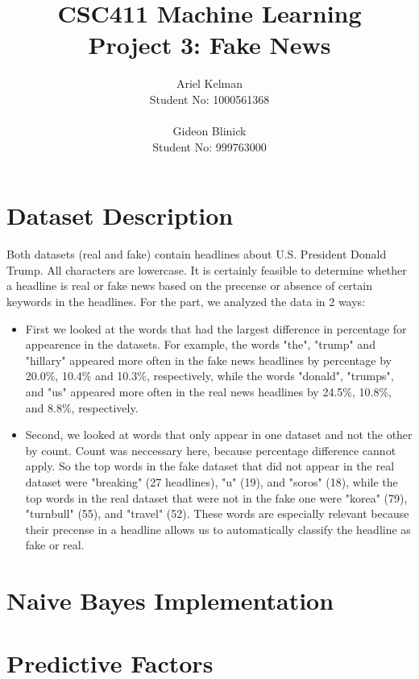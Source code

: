 \documentclass{article}
\title{CSC411 Machine Learning \\ Project 3: Fake News}
\author{ Ariel Kelman \\ Student No: 1000561368
         \\ \\
         Gideon Blinick \\ Student No: 999763000 }
\begin{document}
   \maketitle{}


   \section{Dataset Description}

Both datasets (real and fake) contain headlines about U.S. President Donald Trump. All characters are lowercase.  
It is certainly feasible to determine whether a headline is real or fake news based on the precense or absence of certain keywords in the headlines.
For the part, we analyzed the data in 2 ways:
\begin{itemize}
  \item  First we looked at the words that had the largest difference in percentage for appearence in the datasets. For example,
the words "the", "trump" and "hillary" appeared more often in the fake news headlines by percentage by 20.0\%, 10.4\% and 10.3\%, respectively, while the words
"donald", "trumps", and "us" appeared more often in the real news headlines by 24.5\%, 10.8\%, and 8.8\%, respectively. 
  \item Second, we looked at words that only appear in one dataset and not the other by count. Count was neccessary here, because percentage difference cannot apply.
So the top words in the fake dataset that did not appear in the real dataset were "breaking" (27 headlines), "u" (19), and "soros" (18), while the top words in the real
dataset that were not in the fake one were "korea" (79), "turnbull" (55), and "travel" (52). These words are especially relevant because their precense in a headline
allows us to automatically classify the headline as fake or real.
\end{itemize}







   \section{Naive Bayes Implementation}




   \section{Predictive Factors}
\end{document}
